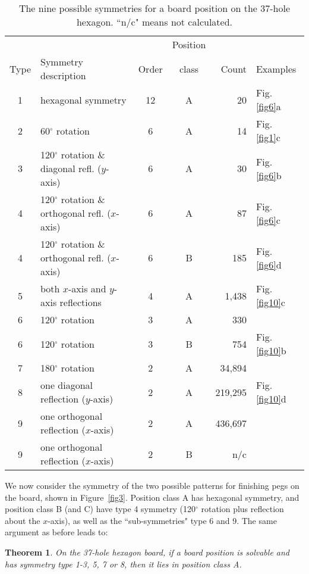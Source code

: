\documentclass[12pt,reqno]{article}
\newtheorem{theorem}{Theorem}
\begin{document}
\begin{table}[htb]
\begin{center} 
\begin{tabular}{ c  l  c  c  r  l }
 & & & Position & & \\
Type & Symmetry description & Order & class & Count & Examples\\
\hline
1 & hexagonal symmetry & 12 & A & 20 & Fig. \ref{fig6}a \\
2 & 60$^{\circ}$ rotation & 6 & A & 14 & Fig. \ref{fig1}c \\
3 & 120$^{\circ}$ rotation \& diagonal refl. ($y$-axis) & 6 & A & 30 & Fig. \ref{fig6}b \\
4 & 120$^{\circ}$ rotation \& orthogonal refl. ($x$-axis) & 6 & A & 87 & Fig. \ref{fig6}c \\
4 & 120$^{\circ}$ rotation \& orthogonal refl. ($x$-axis) & 6 & B & 185 & Fig. \ref{fig6}d \\
5 & both $x$-axis and $y$-axis reflections & 4 & A & 1,438 & Fig. \ref{fig10}c \\
6 & 120$^{\circ}$ rotation & 3 & A & 330 & \\
6 & 120$^{\circ}$ rotation & 3 & B & 754 & Fig. \ref{fig10}b \\
7 & 180$^{\circ}$ rotation & 2 & A & 34,894 & \\
8 & one diagonal reflection ($y$-axis) & 2 & A & 219,295 & Fig. \ref{fig10}d \\
9 & one orthogonal reflection ($x$-axis) & 2 & A & 436,697 & \\
9 & one orthogonal reflection ($x$-axis) & 2 & B & n/c & \\
\end{tabular}
\caption{The nine possible symmetries for a board position on the 37-hole hexagon.
``n/c" means not calculated.} 
\label{tab3}
\end{center} 
\end{table}

We now consider the symmetry of the two possible patterns for finishing pegs on the board,
shown in Figure~\ref{fig3}.  Position class A has hexagonal symmetry, and position class B (and C) have
type 4 symmetry (120$^{\circ}$ rotation plus reflection about the $x$-axis),
as well as the ``sub-symmetries" type 6 and 9.
The same argument as before leads to:

\begin{theorem}
On the 37-hole hexagon board,
if a board position is solvable and has symmetry type 1-3, 5, 7 or 8, 
then it lies in position class A.
\label{th3}
\end{theorem}
\end{document}
